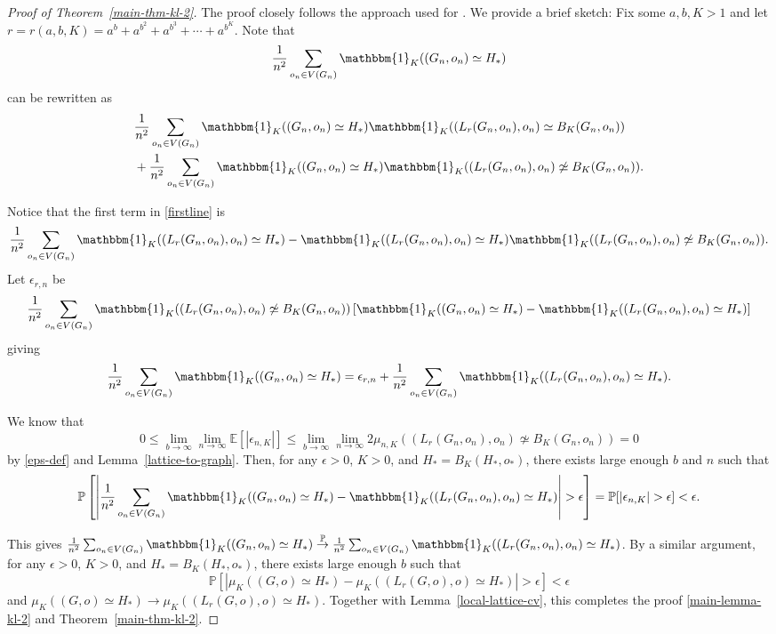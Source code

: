 \documentclass[10pt]{amsart}
\begin{document}
\begin{proof}[Proof of Theorem~\ref{main-thm-kl-2}] 
The proof closely follows the approach used for \cite[Theorem 1.11]{van2021local}. We provide a brief sketch:
Fix some $a, b, K > 1$ and let $r = r(a,b,K) = a^b + a^{b^2} + a^{b^3} + \cdots + a^{b^K}$. Note that $$\frac{1}{n^2}\sum_{o_n\in V(G_n)}  \mathbbm{1}_K ((G_n,o_n) \simeq H_*)$$ can be rewritten as 
\begin{equation}
\begin{split}
    & \frac{1}{n^2}\sum_{o_n\in V(G_n)} \mathbbm{1}_K((G_n,o_n) \simeq H_* ) \mathbbm{1}_K((L_r(G_n, o_n),o_n) \simeq B_K(G_n, o_n))  \label{firstline} \\
    & + \frac{1}{n^2}\sum_{o_n\in V(G_n)}\mathbbm{1}_K((G_n,o_n) \simeq H_*) \mathbbm{1}_K((L_r(G_n, o_n),o_n) \not\simeq B_K(G_n, o_n)). 
\end{split}
\end{equation}

Notice that the first term in \eqref{firstline} is
$$\frac{1}{n^2}\sum_{o_n\in V(G_n)} \mathbbm{1}_K((L_r(G_n, o_n),o_n) \simeq H_*) - \mathbbm{1}_K((L_r(G_n, o_n),o_n) \simeq H_*)  \mathbbm{1}_K((L_r(G_n, o_n),o_n) \not\simeq B_K(G_n, o_n)).$$
Let $\epsilon_{r, n}$ be 
\begin{equation} \label{eps-def}
    \frac{1}{n^2}\sum_{o_n\in V(G_n)} \mathbbm{1}_K((L_r(G_n, o_n),o_n) \not\simeq B_K(G_n, o_n))\left[\mathbbm{1}_K((G_n,o_n) \simeq H_*)  - \mathbbm{1}_K((L_r(G_n, o_n),o_n) \simeq H_*)\right]
\end{equation}
giving
$$\frac{1}{n^2}\sum_{o_n\in V(G_n)}  \mathbbm{1}_K ((G_n,o_n) \simeq H_*) = \epsilon_{r, n} + \frac{1}{n^2}\sum_{o_n\in V(G_n)}\mathbbm{1}_K((L_r(G_n, o_n),o_n) \simeq H_*).$$

We know that $$ 0 \leq \lim_{b \to \infty} \lim_{n \to \infty} \mathbb{E}[|\epsilon_{n, K}|] \leq \lim_{b \to \infty} \lim_{n \to \infty} 2 \mu_{n, K}((L_r(G_n, o_n), o_n) \not\simeq B_K(G_n, o_n)) = 0$$
by \eqref{eps-def} and Lemma~\ref{lattice-to-graph}. Then, for any $\epsilon > 0$, $K > 0$, and $H_* = B_K(H_*, o_*)$, there exists large enough $b$ and $n$ such that
 $$ \mathbb{P} \left[ \left| \frac{1}{n^2} \sum_{o_n\in V(G_n)}  \mathbbm{1}_K ((G_n,o_n) \simeq H_*) -\mathbbm{1}_K((L_r(G_n, o_n),o_n) \simeq H_*)\right| > \epsilon \right] = \mathbb{P} [|\epsilon_{n, K}| > \epsilon] < \epsilon.$$
 
This gives $\frac{1}{n^2} \sum_{o_n\in V(G_n)}  \mathbbm{1}_K ((G_n,o_n) \simeq H_*) \overset{\mathbb P}{\to} \frac{1}{n^2} \sum_{o_n\in V(G_n)} \mathbbm{1}_K((L_r(G_n, o_n),o_n) \simeq H_*)$. By a similar argument, for any $\epsilon > 0$, $K > 0$, and $H_* = B_K(H_*, o_*)$, there exists large enough $b$ such that
$$\mathbb{P} \left[ \left| \mu_K ((G,o) \simeq H_*) -\mu_K((L_r(G, o),o) \simeq H_*)\right| > \epsilon \right] < \epsilon$$ and $\mu_K ((G,o) \simeq H_*) \to  \mu_K((L_r(G, o),o) \simeq H_*)$. Together with Lemma~\ref{local-lattice-cv}, this completes the proof \eqref{main-lemma-kl-2} and Theorem~\ref{main-thm-kl-2}. 
\end{proof}
\end{document}
